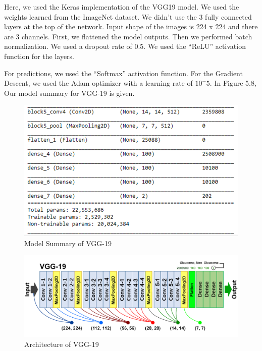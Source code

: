 \vspace{5mm}
\noindent Here, we used the Keras implementation of the VGG19 model. We used the weights learned from the ImageNet dataset. We didn’t use the 3 fully connected layers at the top of the network. Input shape of the images is 224 x 224 and there are 3 channels. First, we flattened the model outputs. Then we performed batch normalization. We used a dropout rate of 0.5. We used the “ReLU” activation function for the layers.

\vspace{5mm}
\noindent For predictions, we used the “Softmax” activation function. For the Gradient Descent, we used the Adam optimizer with a learning rate of \(10^-5\). In Figure 5.8, Our model summary for VGG-19 is given.

\vspace{5mm}
\begin{figure}[hbt!]
\centering
\includegraphics[scale=1]{images/fig-12.png}
\caption{Model Summary of VGG-19}
\label{fig:x Model Summary of VGG-19}
\end{figure}

\vspace{5mm}
\begin{figure}[hbt!]
\centering
\includegraphics[scale=0.75]{images/Architecture of VGG-19.png}
\caption{Architecture of VGG-19}
\label{fig:x Architecture of VGG-19}
\end{figure}

